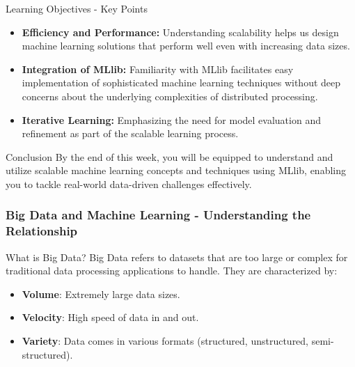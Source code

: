\documentclass[aspectratio=169]{beamer}
\begin{document}
\begin{frame}[fragile]{Learning Objectives - Key Points}
  \begin{itemize}
    \item \textbf{Efficiency and Performance:} Understanding scalability helps us design machine learning solutions that perform well even with increasing data sizes.
    \item \textbf{Integration of MLlib:} Familiarity with MLlib facilitates easy implementation of sophisticated machine learning techniques without deep concerns about the underlying complexities of distributed processing.
    \item \textbf{Iterative Learning:} Emphasizing the need for model evaluation and refinement as part of the scalable learning process.
  \end{itemize}

  \begin{block}{Conclusion}
    By the end of this week, you will be equipped to understand and utilize scalable machine learning concepts and techniques using MLlib, enabling you to tackle real-world data-driven challenges effectively.
  \end{block}
\end{frame}

\begin{frame}[fragile]
    \frametitle{Big Data and Machine Learning - Understanding the Relationship}
    \begin{block}{What is Big Data?}
        Big Data refers to datasets that are too large or complex for traditional data processing applications to handle. They are characterized by:
        \begin{itemize}
            \item \textbf{Volume}: Extremely large data sizes.
            \item \textbf{Velocity}: High speed of data in and out.
            \item \textbf{Variety}: Data comes in various formats (structured, unstructured, semi-structured).
        \end{itemize}
    \end{block}
\end{frame}
\end{document}
